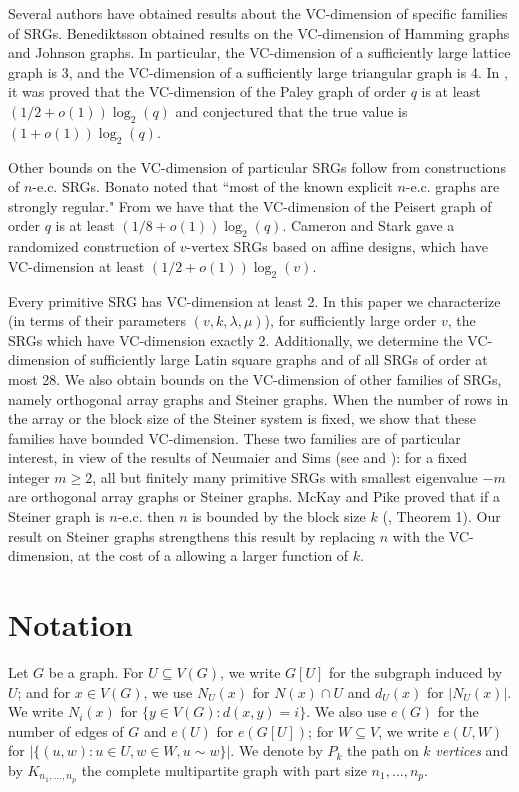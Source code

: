 \documentclass{article}
\theoremstyle{definition}
\begin{document}
Several authors have obtained results about the VC-dimension of specific families of SRGs. Benediktsson \cite{benediktsson2021model} obtained results on the VC-dimension of Hamming graphs and Johnson graphs. In particular, the VC-dimension of a sufficiently large lattice graph is 3, and the VC-dimension of a sufficiently large triangular graph is 4. In \cite{mcdonald2025vc}, it was proved that the VC-dimension of the Paley graph of order $q$ is at least $(1/2+o(1))\log_2(q)$ and conjectured that the true value is $(1+o(1))\log_2(q)$.

Other bounds on the VC-dimension of particular SRGs follow from constructions of $n$-e.c. SRGs. Bonato \cite{bonato2009search} noted that ``most of the known explicit $n$-e.c. graphs are strongly regular." From \cite{kisielewicz2004pseudo} we have that the VC-dimension of the Peisert graph of order $q$ is at least $(1/8+o(1))\log_2(q)$. Cameron and Stark \cite{cameron2002prolific} gave a randomized construction of $v$-vertex SRGs based on affine designs, which have VC-dimension at least $(1/2+o(1))\log_2(v)$.

Every primitive SRG has VC-dimension at least 2. In this paper we characterize (in terms of their parameters $(v,k,\lambda,\mu)$), for sufficiently large order $v$, the SRGs which have VC-dimension exactly 2. Additionally, we determine the VC-dimension of sufficiently large Latin square graphs and of all SRGs of order at most 28. We also obtain bounds on the VC-dimension of other families of SRGs, namely orthogonal array graphs and Steiner graphs. When the number of rows in the array or the block size of the Steiner system is fixed, we show that these families have bounded VC-dimension. These two families are of particular interest, in view of the results of Neumaier and Sims (see \cite[Thm.8.6.3,Thm.8.6.4]{brouwer2022strongly} and \cite{koolen26}): for a fixed integer $m\ge 2$, all but finitely many primitive SRGs with smallest eigenvalue $-m$ are orthogonal array graphs or Steiner graphs. McKay and Pike proved that if a Steiner graph is $n$-e.c. then $n$ is bounded by the block size $k$ (\cite{mckay2007existentially}, Theorem 1). Our result on Steiner graphs strengthens this result by replacing $n$ with the VC-dimension, at the cost of a allowing a larger function of $k$.

\section{Notation}

Let $G$ be a graph. For $U\subseteq V(G)$, we write $G[U]$ for the subgraph induced by $U$; and for $x\in V(G)$, we use $N_U(x)$ for $N(x)\cap U$ and $d_U(x)$ for $|N_U(x)|$. We write $N_i(x)$ for $\{y\in V(G):d(x,y)=i\}.$ We also use $e(G)$ for the number of edges of $G$ and $e(U)$ for $e(G[U])$; for $W\subseteq V$, we write $e(U,W)$ for $|\{(u,w):u\in U,w\in W,u\sim w\}|.$ We denote by $P_k$ the path on $k$ \textit{vertices} and by $K_{n_1,\ldots,n_p}$ the complete multipartite graph with part size $n_1,\ldots,n_p$.
\end{document}
